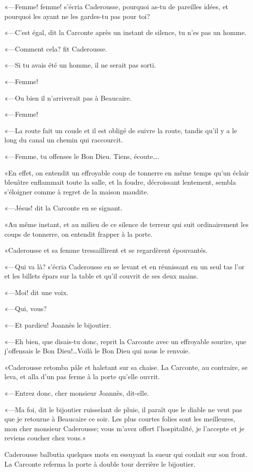 «—Femme! femme! s'écria Caderousse, pourquoi as-tu de pareilles idées, et pourquoi les ayant ne les gardes-tu pas pour toi? 

«—C'est égal, dit la Carconte après un instant de silence, tu n'es pas un homme. 

«—Comment cela? fit Caderousse. 

«—Si tu avais été un homme, il ne serait pas sorti. 

«—Femme! 

«—Ou bien il n'arriverait pas à Beaucaire. 

«—Femme! 

«—La route fait un coude et il est obligé de suivre la route, tandis qu'il y a le long du canal un chemin qui raccourcit. 

«—Femme, tu offenses le Bon Dieu. Tiens, écoute\dots. 

«En effet, on entendit un effroyable coup de tonnerre en même temps qu'un éclair bleuâtre enflammait toute la salle, et la foudre, décroissant lentement, sembla s'éloigner comme à regret de la maison maudite. 

«—Jésus! dit la Carconte en se signant. 

«Au même instant, et au milieu de ce silence de terreur qui suit ordinairement les coups de tonnerre, on entendit frapper à la porte. 

«Caderousse et sa femme tressaillirent et se regardèrent épouvantés. 

«—Qui va là? s'écria Caderousse en se levant et en réunissant en un seul tas l'or et les billets épars sur la table et qu'il couvrit de ses deux mains. 

«—Moi! dit une voix. 

«—Qui, vous? 

«—Et pardieu! Joannès le bijoutier. 

«—Eh bien, que disais-tu donc, reprit la Carconte avec un effroyable sourire, que j'offensais le Bon Dieu!\dots Voilà le Bon Dieu qui nous le renvoie. 

«Caderousse retomba pâle et haletant sur sa chaise. La Carconte, au contraire, se leva, et alla d'un pas ferme à la porte qu'elle ouvrit.  

«—Entrez donc, cher monsieur Joannès, dit-elle. 

«—Ma foi, dit le bijoutier ruisselant de pluie, il paraît que le diable ne veut pas que je retourne à Beaucaire ce soir. Les plus courtes folies sont les meilleures, mon cher monsieur Caderousse; vous m'avez offert l'hospitalité, je l'accepte et je reviens coucher chez vous.» 

Caderousse balbutia quelques mots en essuyant la sueur qui coulait sur son front. La Carconte referma la porte à double tour derrière le bijoutier. 